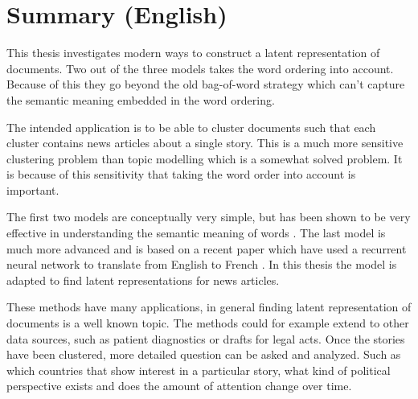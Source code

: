 \chapter{Summary (English)}

This thesis investigates modern ways to construct a latent representation of documents. Two out of the three models takes the word ordering into account. Because of this they go beyond the old bag-of-word strategy which can't capture the semantic meaning embedded in the word ordering. 

The intended application is to be able to cluster documents such that each cluster contains news articles about a single story. This is a much more sensitive clustering problem than topic modelling which is a somewhat solved problem. It is because of this sensitivity that taking the word order into account is important.

The first two models are conceptually very simple, but has been shown to be very effective in understanding the semantic meaning of words \cite{word2vec-details, doc2vec}. The last model is much more advanced and is based on a recent paper which have used a recurrent neural network to translate from English to French \cite{sutskever}. In this thesis the model is adapted to find latent representations for news articles.

These methods have many applications, in general finding latent representation of documents is a well known topic. The methods could for example extend to other data sources, such as patient diagnostics or drafts for legal acts.
Once the stories have been clustered, more detailed question can be asked and analyzed. Such as which countries that show interest in a particular story, what kind of political perspective exists and does the amount of attention change over time.
